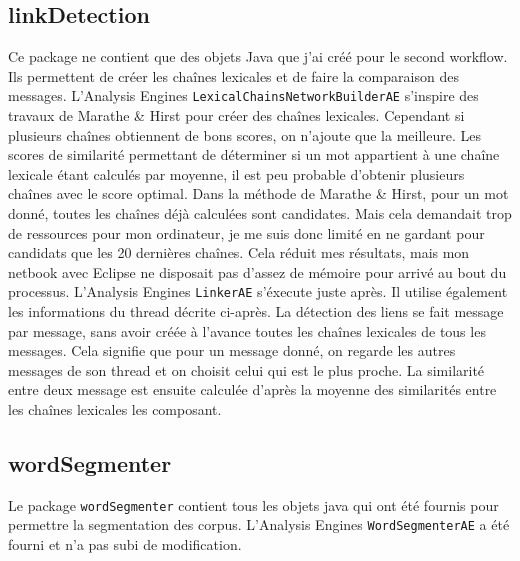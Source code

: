 \documentclass[a4paper]{article}
\begin{document}
	\subsection{linkDetection}
	Ce package ne contient que des objets Java que j'ai créé pour le second workflow. Ils permettent de créer les chaînes lexicales et de faire la comparaison des messages. L'Analysis Engines \texttt{LexicalChainsNetworkBuilderAE} s’inspire des travaux de Marathe \& Hirst pour créer des chaînes lexicales. Cependant si plusieurs chaînes obtiennent de bons scores, on n’ajoute que la meilleure. Les scores de similarité permettant de déterminer si un mot appartient à une chaîne lexicale étant calculés par moyenne, il est peu probable d’obtenir plusieurs chaînes avec le score optimal. Dans la méthode de Marathe \& Hirst, pour un mot donné, toutes les chaînes déjà calculées sont candidates. Mais cela demandait trop de ressources pour mon ordinateur, je me suis donc limité en ne gardant pour candidats que les 20 dernières chaînes. Cela réduit mes résultats, mais mon netbook avec Eclipse ne disposait pas d'assez de mémoire pour arrivé au bout du processus. L'Analysis Engines \texttt{LinkerAE} s'éxecute juste après. Il utilise également les informations du thread décrite ci-après. La détection des liens se fait message par message, sans avoir créée à l'avance toutes les chaînes lexicales de tous les messages. Cela signifie que pour un message donné, on regarde les autres messages de son thread et on choisit celui qui est le plus proche. La similarité entre deux message est ensuite calculée d’après la moyenne des similarités entre les chaînes lexicales les composant.

	\subsection{wordSegmenter}
	Le package \texttt{wordSegmenter} contient tous les objets java qui ont été fournis pour permettre la segmentation des corpus. L'Analysis Engines \texttt{WordSegmenterAE} a été fourni et n'a pas subi de modification.
\end{document}
